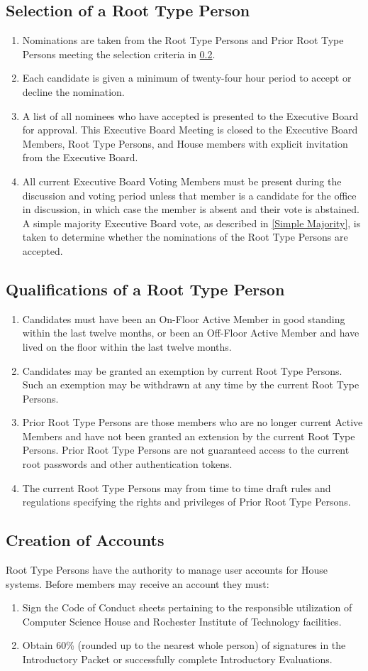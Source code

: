 \documentclass{article}
\newcommand{\bsection}[1]{\subsection{#1} \label{#1}}
\begin{document}
\bsection{Selection of a Root Type Person}
\renewcommand{\theenumi}{\alph{enumi}} %
\begin{enumerate}
	\item Nominations are taken from the Root Type Persons and Prior Root Type Persons meeting the selection criteria in \ref{Qualifications of a Root Type Person}.
	\item Each candidate is given a minimum of twenty-four hour period to accept or decline the nomination.
	\item A list of all nominees who have accepted is presented to the Executive Board for approval. This Executive Board Meeting is closed to the Executive Board Members, Root Type Persons, and House members with explicit invitation from the Executive Board.
	\item All current Executive Board Voting Members must be present during the discussion and voting period unless that member is a candidate for the office in discussion, in which case the member is absent and their vote is abstained. A simple majority Executive Board vote, as described in \ref{Simple Majority}, is taken to determine whether the nominations of the Root Type Persons are accepted.
\end{enumerate}

\bsection{Qualifications of a Root Type Person}
\renewcommand{\theenumi}{\alph{enumi}} %
\begin{enumerate}
	\item Candidates must have been an On-Floor Active Member in good standing within the last twelve months, or been an Off-Floor Active Member and have lived on the floor within the last twelve months.
	\item Candidates may be granted an exemption by current Root Type Persons. Such an exemption may be withdrawn at any time by the current Root Type Persons.
	\item Prior Root Type Persons are those members who are no longer current Active Members and have not been granted an extension by the current Root Type Persons. Prior Root Type Persons are not guaranteed access to the current root passwords and other authentication tokens.
	\item The current Root Type Persons may from time to time draft rules and regulations specifying the rights and privileges of Prior Root Type Persons.
\end{enumerate}

\bsection{Creation of Accounts}
Root Type Persons have the authority to manage user accounts for House systems. Before members may receive an account they must:
\renewcommand{\theenumi}{\alph{enumi}} %
\begin{enumerate}
	\item Sign the Code of Conduct sheets pertaining to the responsible utilization of Computer Science House and Rochester Institute of Technology facilities.
	\item Obtain 60\% (rounded up to the nearest whole person) of signatures in the Introductory Packet or successfully complete Introductory Evaluations.
\end{enumerate}
\end{document}
